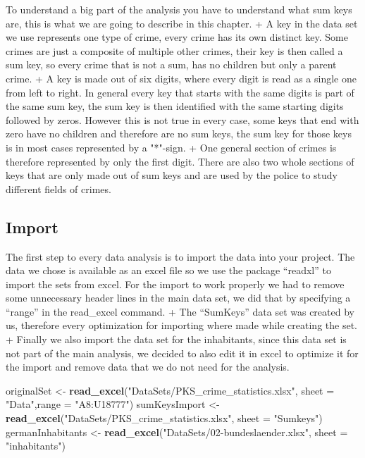 \documentclass[
]{article}
\newenvironment{Shaded}{\begin{snugshade}}{\end{snugshade}}
\newcommand{\DataTypeTok}[1]{\textcolor[rgb]{0.13,0.29,0.53}{#1}}
\newcommand{\KeywordTok}[1]{\textcolor[rgb]{0.13,0.29,0.53}{\textbf{#1}}}
\newcommand{\NormalTok}[1]{#1}
\newcommand{\StringTok}[1]{\textcolor[rgb]{0.31,0.60,0.02}{#1}}
\begin{document}
To understand a big part of the analysis you have to understand what sum
keys are, this is what we are going to describe in this chapter. + A key
in the data set we use represents one type of crime, every crime has its
own distinct key. Some crimes are just a composite of multiple other
crimes, their key is then called a sum key, so every crime that is not a
sum, has no children but only a parent crime. + A key is made out of six
digits, where every digit is read as a single one from left to right. In
general every key that starts with the same digits is part of the same
sum key, the sum key is then identified with the same starting digits
followed by zeros. However this is not true in every case, some keys
that end with zero have no children and therefore are no sum keys, the
sum key for those keys is in most cases represented by a "*"-sign. + One
general section of crimes is therefore represented by only the first
digit. There are also two whole sections of keys that are only made out
of sum keys and are used by the police to study different fields of
crimes.

\hypertarget{import}{%
\subsection{Import}\label{import}}

The first step to every data analysis is to import the data into your
project. The data we chose is available as an excel file so we use the
package ``readxl'' to import the sets from excel. For the import to work
properly we had to remove some unnecessary header lines in the main data
set, we did that by specifying a ``range'' in the read\_excel command. +
The ``SumKeys'' data set was created by us, therefore every optimization
for importing where made while creating the set. + Finally we also
import the data set for the inhabitants, since this data set is not part
of the main analysis, we decided to also edit it in excel to optimize it
for the import and remove data that we do not need for the analysis.

\begin{Shaded}
\begin{Highlighting}[]
\NormalTok{originalSet <-}\StringTok{ }\KeywordTok{read_excel}\NormalTok{(}\StringTok{"DataSets/PKS_crime_statistics.xlsx"}\NormalTok{, }\DataTypeTok{sheet =} \StringTok{"Data"}\NormalTok{,}\DataTypeTok{range =} \StringTok{"A8:U18777"}\NormalTok{) }
\NormalTok{sumKeysImport <-}\StringTok{ }\KeywordTok{read_excel}\NormalTok{(}\StringTok{"DataSets/PKS_crime_statistics.xlsx"}\NormalTok{, }\DataTypeTok{sheet =} \StringTok{"Sumkeys"}\NormalTok{)}
\NormalTok{germanInhabitants <-}\StringTok{ }\KeywordTok{read_excel}\NormalTok{(}\StringTok{"DataSets/02-bundeslaender.xlsx"}\NormalTok{, }\DataTypeTok{sheet =} \StringTok{"inhabitants"}\NormalTok{)}
\end{Highlighting}
\end{Shaded}
\end{document}
